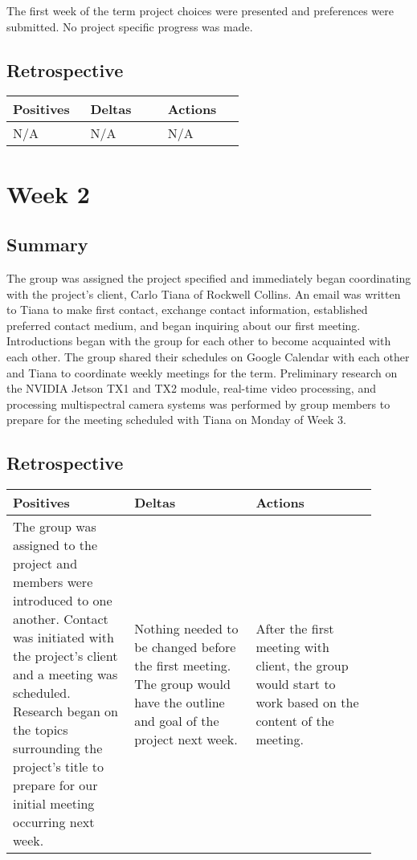 \documentclass[letterpaper,10pt,serif,draftclsnofoot,onecolumn,compsoc,titlepage]{IEEEtran}
\begin{document}
The first week of the term project choices were presented and preferences were
submitted. No project specific progress was made. \\

\subsection{Retrospective}

\begin{tabular}{|p{0.3\linewidth}|p{0.3\linewidth}|p{0.3\linewidth}|}
   \hline
   \textbf{Positives} & \textbf{Deltas} & \textbf{Actions}\\ 
   \hline
   N/A 
   & N/A 
   & N/A \\
   \hline
\end{tabular}

\section{Week 2}

\subsection{Summary}

The group was assigned the project specified and immediately began coordinating 
with the project's client, Carlo Tiana of Rockwell Collins. 
An email was written to Tiana to make first contact, exchange contact 
information,
established preferred contact medium, and began inquiring about our first meeting.
Introductions began with the group for each other to become acquainted with 
each other. 
The group shared their schedules on Google Calendar with each other and Tiana 
to coordinate weekly meetings for the term. 
Preliminary research on the NVIDIA Jetson TX1 and TX2 module, real-time video 
processing, and processing multispectral camera systems was performed by group members 
to prepare for the meeting scheduled with Tiana on Monday of Week 3. \\


\subsection{Retrospective}

\begin{tabular}{|p{0.3\linewidth}|p{0.3\linewidth}|p{0.3\linewidth}|}
   \hline
   \textbf{Positives} & \textbf{Deltas} & \textbf{Actions}\\ 
   \hline
   The group was assigned to the project and members were introduced to one another. 
   Contact was initiated with the project's client and a meeting was scheduled. 
   Research began on the topics surrounding the project's title to prepare 
   for our initial meeting occurring next week. 
   & 
   Nothing needed to be changed before the first meeting. The group would have the outline 
   and goal of the project next week. 
   & 
   After the first meeting with client, the group would start to work based on the content 
   of the meeting. \\
   \hline
\end{tabular}
\end{document}
